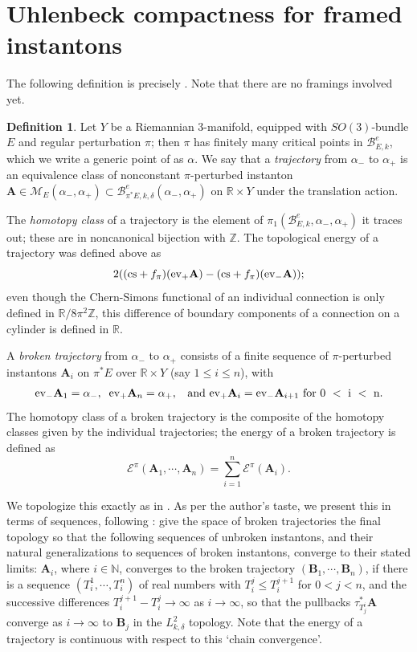 \documentclass[10pt,a4paper]{amsart}
\newcommand{\pE}{\pi^* \! E}
\theoremstyle{definition}
\newtheorem{definition}[theorem]{Definition}
\theoremstyle{remark}
\numberwithin{figure}{qchap}
\begin{document}
\section{Uhlenbeck compactness for framed instantons}\label{sec:4d-compact}
The following definition is precisely \cite[Definition~16.1.1]{KMSW}. Note that there are no framings involved yet.

\begin{definition}Let $Y$ be a Riemannian 3-manifold, equipped with $SO(3)$-bundle $E$ and regular perturbation $\pi$; then $\pi$ has finitely many critical points in $\mathcal B^e_{E,k}$, which we write a generic point of as $\alpha$. We say that a \emph{trajectory} from $\alpha_-$ to $\alpha_+$ is an equivalence class of nonconstant $\pi$-perturbed instanton $\mathbf A \in \mathcal M_{E}(\alpha_-, \alpha_+) \subset \mathcal B^e_{\pE,k,\delta}(\alpha_-,\alpha_+)$ on $\mathbb R \times Y$ under the translation action. 

The \emph{homotopy class} of a trajectory is the element of $\pi_1(\mathcal B^e_{E,k}, \alpha_-, \alpha_+)$ it traces out; these are in noncanonical bijection with $\mathbb Z$. The topological energy of a trajectory was defined above as 
$$2((\textup{cs}+f_\pi)(\textup{ev}_+  \mathbf{A}) -  (\textup{cs} + f_\pi)(\textup{ev}_-\mathbf{A}));$$ 
even though the Chern-Simons functional of an individual connection is only defined in $\mathbb R/8\pi^2\mathbb Z$, this difference of boundary components of a connection on a cylinder is defined in $\mathbb R$.

A \emph{broken trajectory} from $\alpha_-$ to $\alpha_+$ consists of a finite sequence of $\pi$-perturbed instantons $\mathbf{A}_i$ on $\pE$ over $\mathbb R \times Y$ (say $1 \leq i \leq n$), with $$\textup{ev}_-\mathbf{A}_1 = \alpha_-, \; \; \textup{ev}_+ \mathbf{A}_n = \alpha_+, \;\; \text{ and } \textup{ev}_+ \mathbf{A}_i = \textup{ev}_- \mathbf{A}_{i+1} \text{  for 0 }< \text{ i } < \text{ n}.$$ The homotopy class of a broken trajectory is the composite of the homotopy classes given by the individual trajectories; the energy of a broken trajectory is defined as $$\mathcal E^\pi(\mathbf{A}_1, \cdots, \mathbf{A}_n) = \sum_{i=1}^n \mathcal E^\pi(\mathbf{A}_i).$$
\end{definition}

We topologize this exactly as in \cite[Page~276]{KMSW}. As per the author's taste, we present this in terms of sequences, following \cite[Page~116]{Don}: give the space of broken trajectories the final topology so that the following sequences of unbroken instantons, and their natural generalizations to sequences of broken instantons, converge to their stated limits: $\mathbf{A}_i$, where $i \in \mathbb N$, converges to the broken trajectory $(\mathbf{B}_1, \cdots, \mathbf{B}_n)$, if there is a sequence $(T_i^1, \cdots, T_i^n)$ of real numbers with $T_i^j \leq T_i^{j+1}$ for $0 < j < n$, and the successive differences $T^{j+1}_i - T^j_i \to \infty$ as $i \to \infty$, so that the pullbacks $\tau_{T^i_j}^* \mathbf{A}$ converge as $i \to \infty$ to $\mathbf{B}_j$ in the $L^2_{k,\delta}$ topology. Note that the energy of a trajectory is continuous with respect to this `chain convergence'. 
\end{document}
